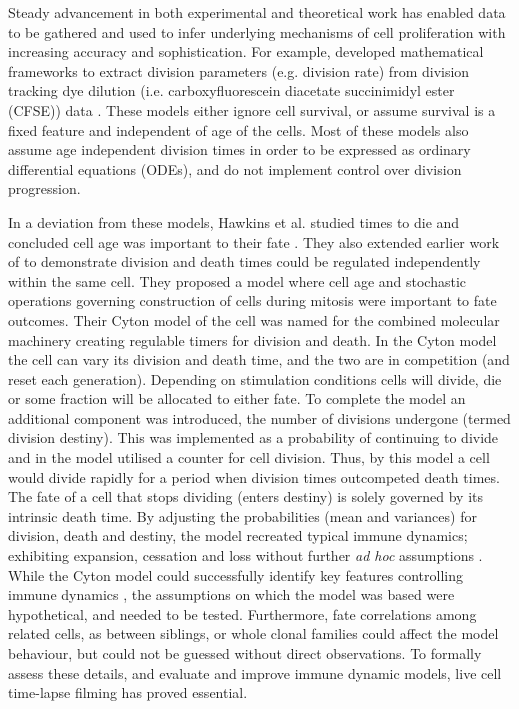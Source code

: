 \documentclass[11pt, a4paper]{article}
\begin{document}
Steady advancement in both experimental and theoretical work has enabled data to be gathered and used to infer underlying mechanisms of cell proliferation with increasing accuracy and sophistication. For example, \cite{Gett.2000, Boer.2005, Ganusov.2005, Asquith.2006, Hawkins.2007, Luzyanina.2007, Hyrien.2008, Zilman.2010, Banks.2011, Miao.2011, Banks.2012, Shokhirev.2013, Mazzocco.2017} developed mathematical frameworks to extract division parameters (e.g. division rate) from division tracking dye dilution (i.e. carboxyfluorescein diacetate succinimidyl ester (CFSE)) data \parencite{Lyons.1994}. These models either ignore cell survival, or assume survival is a fixed feature and independent of age of the cells. Most of these models also assume age independent division times in order to be expressed as ordinary differential equations (ODEs), and do not implement control over division progression.

In a deviation from these models, Hawkins et al. studied times to die and concluded cell age was important to their fate \parencite{Hawkins.2007}. They also extended earlier work of \cite{Gett.2000} to demonstrate division and death times could be regulated independently within the same cell. They proposed a model where cell age and stochastic operations governing construction of cells during mitosis were important to fate outcomes. Their Cyton model of the cell was named for the combined molecular machinery creating regulable timers for division and death. In the Cyton model the cell can vary its division and death time, and the two are in competition (and reset each generation). Depending on stimulation conditions cells will divide, die or some fraction will be allocated to either fate. To complete the model an additional component was introduced, the number of divisions undergone (termed division destiny). This was implemented as a probability of continuing to divide and in the model utilised a counter for cell division. Thus, by this model a cell would divide rapidly for a period when division times outcompeted death times. The fate of a cell that stops dividing (enters destiny) is solely governed by its intrinsic death time. By adjusting the probabilities (mean and variances) for division, death and destiny, the model recreated typical immune dynamics; exhibiting expansion, cessation and loss without further \textit{ad hoc} assumptions \parencite{Hawkins.2007, Subramanian.2007, Lee.2009, Wellard.2011}. While the Cyton model could successfully identify key features controlling immune dynamics \parencite{Hawkins.2013, Shokhirev.2013, Marchingo.2014, Shokhirev.2015, Mitchell.2018}, the assumptions on which the model was based were hypothetical, and needed to be tested. Furthermore, fate correlations among related cells, as between siblings, or whole clonal families could affect the model behaviour, but could not be guessed without direct observations. To formally assess these details, and evaluate and improve immune dynamic models, live cell time-lapse filming has proved essential.
\end{document}
